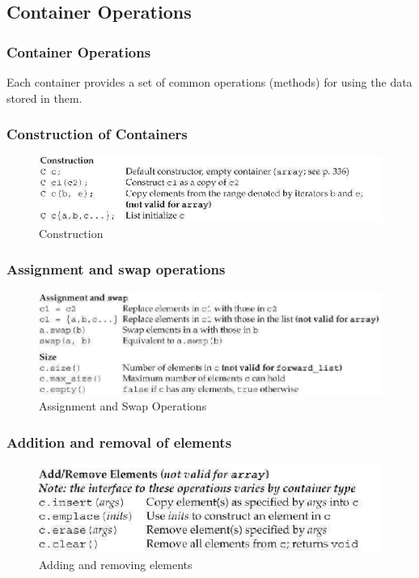 \documentclass{beamer}
\newtheorem{Key points}{Key points}
\begin{document}
\subsection{Container Operations}
\begin{frame}
  \frametitle{Container Operations}
Each container provides a set of common operations (methods) for using the data stored in them. 
\end{frame}
 \begin{frame}
\frametitle{Construction of Containers}
   \begin{figure}
     \centering
     \includegraphics[width=1\columnwidth]{construction}
     \caption{Construction}
   \end{figure}
 \end{frame}

 \begin{frame}
\frametitle{Assignment and swap operations}
   \begin{figure}
     \centering
     \includegraphics[width=1\columnwidth]{cons2}
     \caption{Assignment and Swap Operations}
   \end{figure}
 \end{frame}

 \begin{frame}
\frametitle{Addition and removal of elements}
   \begin{figure}
     \centering
     \includegraphics[width=1\columnwidth]{add}
     \caption{Adding and removing elements}
   \end{figure}
 \end{frame}
\end{document}
